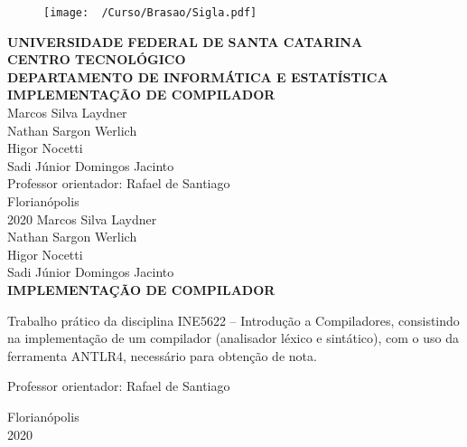 \documentclass[12pt,a4paper,brazil,abntex2]{article}
\begin{document}
\singlespacing
\begin{titlepage}
\begin{center}
\begin{figure}[!htb]
\center

\texttt{[image: ~/Curso/Brasao/Sigla.pdf]} 

\end{figure}
{\bf  UNIVERSIDADE FEDERAL DE SANTA CATARINA}\\[0.2cm] %
{\bf CENTRO TECNOLÓGICO}\\[0.2cm] %
{\bf  DEPARTAMENTO DE INFORMÁTICA E ESTATÍSTICA}\\[5.5cm]
{\bf \large IMPLEMENTAÇÃO DE COMPILADOR}\\[3.8cm] %
{Marcos Silva Laydner}\\
{Nathan Sargon Werlich}\\
{Higor Nocetti}\\
{Sadi Júnior Domingos Jacinto}\\[0.7cm] %
{Professor orientador: Rafael de Santiago}\\[4cm]
{Florianópolis}\\[0.2cm]
{2020}
\newpage
\thispagestyle{empty}
{Marcos Silva Laydner}\\
{Nathan Sargon Werlich}\\
{Higor Nocetti}\\
{Sadi Júnior Domingos Jacinto}\\[9cm] %
{\bf \large IMPLEMENTAÇÃO DE COMPILADOR}\\[0.5cm]
    \begin{flushright}
    \begin{list}{}{
      \setlength{\leftmargin}{7.2cm}
      \setlength{\rightmargin}{0cm}
      \setlength{\labelwidth}{0pt}
      \setlength{\labelsep}{\leftmargin}}
      \item Trabalho prático da disciplina INE5622 – Introdução a Compiladores, consistindo na implementação de um compilador (analisador léxico e sintático), com o uso da ferramenta ANTLR4, necessário para obtenção de nota.\\[0.2 cm] 
      \setlength{\labelsep}{\leftmargin}
      \item Professor orientador: Rafael de Santiago\
      \\[8.2cm]
     \end{list}
	 \end{flushright}
{Florianópolis}\\[0.2cm]
{2020}
\end{center}
\end{titlepage} %
\newpage
\thispagestyle{empty}
\begin{center}
\tableofcontents
\end{center}






\end{document}
